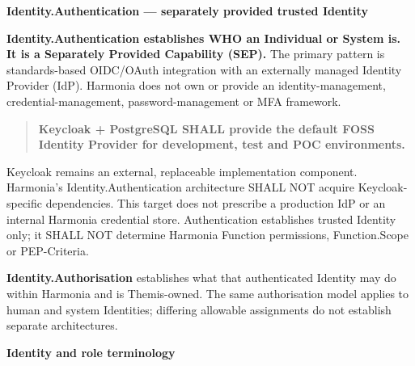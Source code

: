 \par\medskip\textbf{Identity.Authentication — separately provided trusted Identity}\par


\textbf{Identity.Authentication establishes WHO an Individual or System is. It is a
Separately Provided Capability (SEP).} The primary pattern is standards-based
OIDC/OAuth integration with an externally managed Identity Provider (IdP).
Harmonia does not own or provide an identity-management, credential-management,
password-management or MFA framework.



\begin{quote}


\textbf{Keycloak + PostgreSQL SHALL provide the default FOSS Identity Provider for
development, test and POC environments.}



\end{quote}


Keycloak remains an external, replaceable implementation component. Harmonia's
Identity.Authentication architecture SHALL NOT acquire Keycloak-specific
dependencies. This target does not prescribe a production IdP or an internal
Harmonia credential store. Authentication establishes trusted Identity only;
it SHALL NOT determine Harmonia Function permissions, Function.Scope or PEP-Criteria.



\textbf{Identity.Authorisation} establishes what that authenticated Identity may do
within Harmonia and is Themis-owned. The same authorisation model applies to
human and system Identities; differing allowable assignments do not establish
separate architectures.







\par\medskip\textbf{Identity and role terminology}\par


